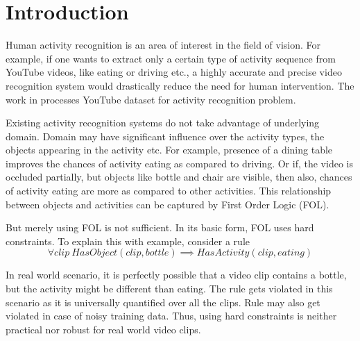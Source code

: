 \chapter{Introduction}

\label{ch1_INTRO}






Human activity recognition is an area of interest in the field of vision.
For example, if one wants to extract only a certain type of activity
sequence from YouTube videos, like eating or driving etc., a highly accurate and precise 
video recognition system would drastically reduce the need for human intervention.
The work in \cite{improving} processes YouTube dataset for activity recognition problem.

\begin{comment}
This project tries to improve the existing activity recognition system
by adding semantic information about the domain and support for uncertainty to it.
\end{comment}

Existing activity recognition systems \cite{actionsInContext,Realistic,improving}  do not take advantage of underlying domain.
Domain may have significant influence over the activity types, the objects appearing
in the activity etc. For example, presence of a dining table improves the chances
of activity eating as compared to driving. Or if, the video is occluded partially,
but objects like bottle and chair are visible, then also, chances of activity eating
are more as compared to other activities. This relationship between objects and activities
can be captured by First Order Logic (FOL).

But merely using FOL is not sufficient. In its basic form, FOL uses hard constraints.
To explain this with example, consider a rule
\begin{equation}
	\label{MLNRule}
	\forall clip ~ HasObject( clip, bottle ) \implies HasActivity( clip, eating )
\end{equation}

In real world scenario, it is perfectly possible that a video clip contains a bottle,
but the activity might be different than eating. 
The rule gets violated in this scenario as it is universally quantified over all the clips. 
Rule may also get violated in case of noisy training data. 
Thus, using hard constraints is neither practical nor robust for real world video clips. 

